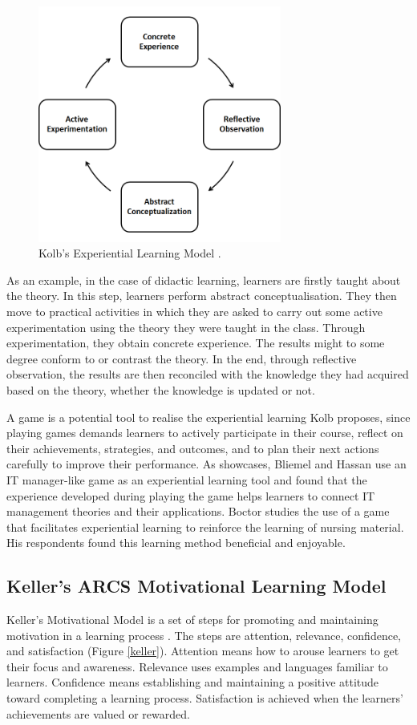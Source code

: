 \documentclass[12pt, a4paper]{report}
\begin{document}
\begin{figure}[ht]
\centering
\includegraphics[width=8cm]{kolb}
\caption{Kolb's Experiential Learning Model \cite{kolb2014experiential}.}
\label{kolb}
\end{figure}

As an example, in the case of didactic learning, learners are firstly taught about the theory. In this step, learners perform abstract conceptualisation. They then move to practical activities in which they are asked to carry out some active experimentation using the theory they were taught in the class. Through experimentation, they obtain concrete experience. The results might to some degree conform to or contrast the theory. In the end, through reflective observation, the results are then reconciled with the knowledge they had acquired based on the theory, whether the knowledge is updated or not. 

A game is a potential tool to realise the experiential learning Kolb proposes, since playing games demands learners to actively participate in their course, reflect on their achievements, strategies, and outcomes, and to plan their next actions carefully to improve their performance. As showcases, Bliemel and Hassan \cite{bliemel2014game} use an IT manager-like game as an experiential learning tool and found that the experience developed during playing the game helps learners to connect IT management theories and their applications. Boctor \cite{boctor2013active} studies the use of a game that facilitates experiential learning to reinforce the learning of nursing material. His respondents found this learning method beneficial and enjoyable. 
 
\subsection{Keller's ARCS Motivational Learning Model}
Keller's Motivational Model is a set of steps for promoting and maintaining motivation in a learning process \cite{keller2010motivational}. The steps are attention, relevance, confidence, and satisfaction (Figure \ref{keller}). Attention means how to arouse learners to get their focus and awareness. Relevance uses examples and languages familiar to learners. Confidence means establishing and maintaining a positive attitude toward completing a learning process. Satisfaction is achieved when the learners' achievements are valued or rewarded. 
\end{document}
